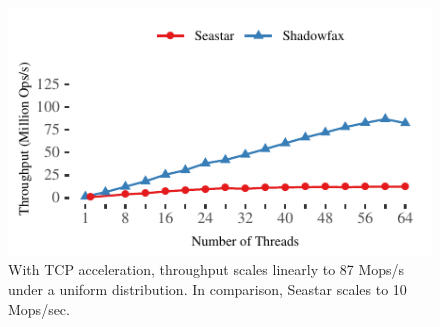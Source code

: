 \begin{figure}[t]
\centering
\includegraphics[width=0.9\columnwidth]{graphs/thread-scalability-comparison.pdf}
\caption{With TCP acceleration,
    throughput scales linearly to 87 Mops/s under a uniform distribution.
    In comparison, Seastar scales to 10 Mops/sec.}
\label{fig:thread-scalability-comparison}
\end{figure}
